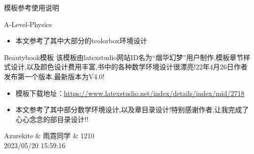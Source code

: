 \begin{ascolorbox5}{模板参考使用说明}
\begin{ascboxB}{A-Level-Physics}
\begin{itemize}
	\item 本文参考了其中大部分的tcolorbox环境设计
\end{itemize} 	
\end{ascboxB}
\begin{ascboxB}{Beautybook模板}
该模板由latexstudio网站ID名为“烟华幻梦”用户制作,模板章节样式设计,以及颜色设计费用丰富,书中的各种数学环境设计很漂亮!22年4月26日作者发布第一个版本,最新版本为V4.0!
    \begin{itemize}
        \item 模板下载地址：\href{https://www.latexstudio.net/index/details/index/mid/2718}{https://www.latexstudio.net/index/details/index/mid/2718}
        \item 本文参考了其中部分数学环境设计,以及章目录设计!特别感谢作者,让我完成了心心念念的部目录设计!!
    \end{itemize} 	
\end{ascboxB}
\end{ascolorbox5}
\begin{flushright}
	Azurekite \& 雨霓同学 \& 1210 \\
	2023/05/20 15:59:16
\end{flushright}

\frontmatter